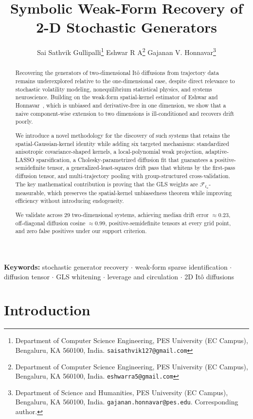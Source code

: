 \documentclass[11pt]{article}
\title{Symbolic Weak-Form Recovery of 2-D Stochastic Generators}
\author{%
  Sai Sathvik Gullipalli\thanks{Department of Computer Science Engineering, PES University
  (EC Campus), Bengaluru, KA 560100, India. \texttt{saisathvik127@gmail.com}} \quad
  Eshwar R A\thanks{Department of Computer Science Engineering, PES University
  (EC Campus), Bengaluru, KA 560100, India. \texttt{eshwarra5@gmail.com}} \quad
  Gajanan V. Honnavar\thanks{Department of Science and Humanities, PES University
  (EC Campus), Bengaluru, KA 560100, India. \texttt{gajanan.honnavar@pes.edu}.
  Corresponding author.}%
}
\date{}
\begin{document}
\maketitle

\begin{abstract}
Recovering the generators of two-dimensional It\^o diffusions from trajectory data remains
underexplored relative to the one-dimensional case, despite direct relevance to stochastic
volatility modeling, nonequilibrium statistical physics, and systems neuroscience. Building on
the weak-form spatial-kernel estimator of Eshwar and Honnavar~\cite{eshwar2026weak}, which is
unbiased and derivative-free in one dimension, we show that a naive component-wise extension to
two dimensions is ill-conditioned and recovers drift poorly.

We introduce a novel methodology for the discovery of such systems that retains the
spatial-Gaussian-kernel identity while adding six targeted mechanisms: standardized anisotropic
covariance-shaped kernels, a local-polynomial weak projection, adaptive-LASSO sparsification, a
Cholesky-parametrized diffusion fit that guarantees a positive-semidefinite tensor, a
generalized-least-squares drift pass that whitens by the first-pass diffusion tensor, and
multi-trajectory pooling with group-structured cross-validation. The key mathematical
contribution is proving that the GLS weights are $\mathcal{F}_{t_n}$-measurable, which preserves
the spatial-kernel unbiasedness theorem while improving efficiency without introducing
endogeneity.

We validate across 29 two-dimensional systems, achieving median drift error $\approx 0.23$,
off-diagonal diffusion cosine $\approx 0.99$, positive-semidefinite tensors at every grid point,
and zero false positives under our support criterion.
\end{abstract}

\noindent\textbf{Keywords:} stochastic generator recovery $\cdot$ weak-form sparse
identification $\cdot$ diffusion tensor $\cdot$ GLS whitening $\cdot$ leverage and circulation
$\cdot$ 2D It\^o diffusions

\section{Introduction}\label{sec:intro}
\end{document}

